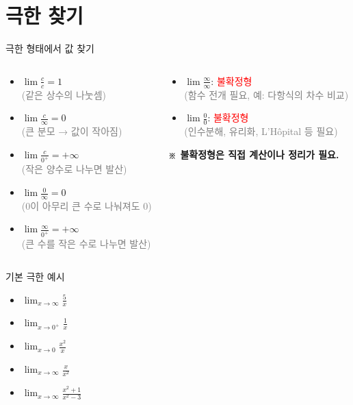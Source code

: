 \documentclass[aspectratio=169]{beamer}
\begin{document}
\section{극한 찾기}
\begin{frame}{극한 형태에서 값 찾기}
  \begin{columns}
    \begin{column}{0.5\textwidth}
      \begin{itemize}
        \item \( \lim \frac{c}{c} = 1 \) \\
              \textcolor{gray}{(같은 상수의 나눗셈)}
        \item \( \lim \frac{c}{\infty} = 0 \) \\
              \textcolor{gray}{(큰 분모 → 값이 작아짐)}
        \item \( \lim \frac{c}{0^+} = +\infty \) \\
              \textcolor{gray}{(작은 양수로 나누면 발산)}
        \item \( \lim \frac{0}{\infty} = 0 \) \\
              \textcolor{gray}{(0이 아무리 큰 수로 나눠져도 0)}
        \item \( \lim \frac{\infty}{0^+} = +\infty \) \\
              \textcolor{gray}{(큰 수를 작은 수로 나누면 발산)}
      \end{itemize}
    \end{column}
    \begin{column}{0.5\textwidth}
      \begin{itemize}
        \item \( \lim \frac{\infty}{\infty} \): \textcolor{red}{불확정형} \\
              \textcolor{gray}{(함수 전개 필요, 예: 다항식의 차수 비교)}
        \item \( \lim \frac{0}{0} \): \textcolor{red}{불확정형} \\
              \textcolor{gray}{(인수분해, 유리화, L'Hôpital 등 필요)}
      \end{itemize}
      \vspace{1em}
      \textbf{※ 불확정형은 직접 계산이나 정리가 필요.}
    \end{column}
  \end{columns}
\end{frame}



\begin{frame}{기본 극한 예시}
  \begin{itemize}
    \item \( \lim_{x \to \infty} \frac{5}{x}  \)
    \item \( \lim_{x \to 0^+} \frac{1}{x}  \)
    \item \( \lim_{x \to 0} \frac{x^2}{x}  \)
    \item \( \lim_{x \to \infty} \frac{x}{x^2}  \)
    \item \( \lim_{x \to \infty} \frac{x^2 + 1}{x^2 - 3}  \)
  \end{itemize}
\end{frame}
\end{document}
